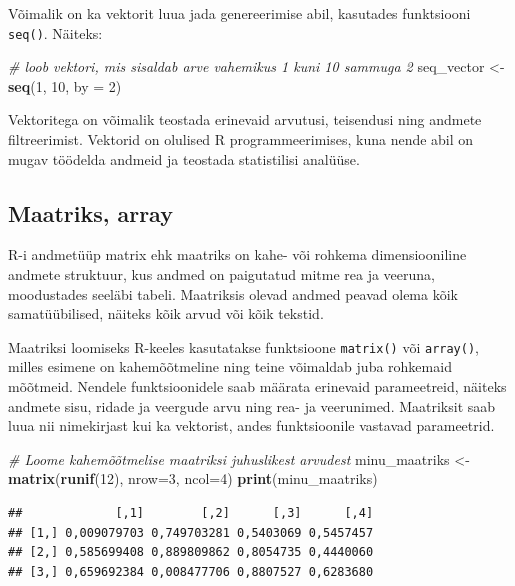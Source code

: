 \documentclass[
]{book}
\newenvironment{Shaded}{\begin{snugshade}}{\end{snugshade}}
\newcommand{\AttributeTok}[1]{\textcolor[rgb]{0.13,0.29,0.53}{#1}}
\newcommand{\CommentTok}[1]{\textcolor[rgb]{0.56,0.35,0.01}{\textit{#1}}}
\newcommand{\DecValTok}[1]{\textcolor[rgb]{0.00,0.00,0.81}{#1}}
\newcommand{\FunctionTok}[1]{\textcolor[rgb]{0.13,0.29,0.53}{\textbf{#1}}}
\newcommand{\NormalTok}[1]{#1}
\newcommand{\OtherTok}[1]{\textcolor[rgb]{0.56,0.35,0.01}{#1}}
\renewenvironment{Shaded} {\begin{snugshade}\footnotesize} {\end{snugshade}}
\begin{document}
Võimalik on ka vektorit luua jada genereerimise abil, kasutades funktsiooni \texttt{seq()}. Näiteks:

\begin{Shaded}
\begin{Highlighting}[]
\CommentTok{\# loob vektori, mis sisaldab arve vahemikus 1 kuni 10 sammuga 2}
\NormalTok{seq\_vector }\OtherTok{\textless{}{-}} \FunctionTok{seq}\NormalTok{(}\DecValTok{1}\NormalTok{, }\DecValTok{10}\NormalTok{, }\AttributeTok{by =} \DecValTok{2}\NormalTok{) }
\end{Highlighting}
\end{Shaded}

Vektoritega on võimalik teostada erinevaid arvutusi, teisendusi ning andmete filtreerimist. Vektorid on olulised R programmeerimises, kuna nende abil on mugav töödelda andmeid ja teostada statistilisi analüüse.

\subsection{Maatriks, array}\label{maatriks-array}

R-i andmetüüp matrix ehk maatriks on kahe- või rohkema dimensiooniline andmete struktuur, kus andmed on paigutatud mitme rea ja veeruna, moodustades seeläbi tabeli. Maatriksis olevad andmed peavad olema kõik samatüübilised, näiteks kõik arvud või kõik tekstid.

Maatriksi loomiseks R-keeles kasutatakse funktsioone \texttt{matrix()} või \texttt{array()}, milles esimene on kahemõõtmeline ning teine võimaldab juba rohkemaid mõõtmeid. Nendele funktsioonidele saab määrata erinevaid parameetreid, näiteks andmete sisu, ridade ja veergude arvu ning rea- ja veerunimed. Maatriksit saab luua nii nimekirjast kui ka vektorist, andes funktsioonile vastavad parameetrid.

\begin{Shaded}
\begin{Highlighting}[]
\CommentTok{\# Loome kahemõõtmelise maatriksi juhuslikest arvudest}
\NormalTok{minu\_maatriks }\OtherTok{\textless{}{-}} \FunctionTok{matrix}\NormalTok{(}\FunctionTok{runif}\NormalTok{(}\DecValTok{12}\NormalTok{), }\AttributeTok{nrow=}\DecValTok{3}\NormalTok{, }\AttributeTok{ncol=}\DecValTok{4}\NormalTok{)}
\FunctionTok{print}\NormalTok{(minu\_maatriks)}
\end{Highlighting}
\end{Shaded}

\begin{verbatim}
##             [,1]        [,2]      [,3]      [,4]
## [1,] 0,009079703 0,749703281 0,5403069 0,5457457
## [2,] 0,585699408 0,889809862 0,8054735 0,4440060
## [3,] 0,659692384 0,008477706 0,8807527 0,6283680
\end{verbatim}
\end{document}
